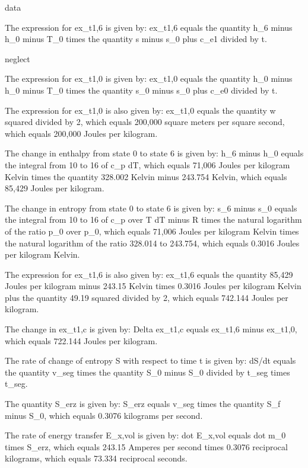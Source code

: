 data

The expression for ex_t1,6 is given by:
ex_t1,6 equals the quantity h_6 minus h_0 minus T_0 times the quantity s minus s_0 plus c_e1 divided by t.

neglect

The expression for ex_t1,0 is given by:
ex_t1,0 equals the quantity h_0 minus h_0 minus T_0 times the quantity s_0 minus s_0 plus c_e0 divided by t.

The expression for ex_t1,0 is also given by:
ex_t1,0 equals the quantity w squared divided by 2, which equals 200,000 square meters per square second, which equals 200,000 Joules per kilogram.

The change in enthalpy from state 0 to state 6 is given by:
h_6 minus h_0 equals the integral from 10 to 16 of c_p dT, which equals 71,006 Joules per kilogram Kelvin times the quantity 328.002 Kelvin minus 243.754 Kelvin, which equals 85,429 Joules per kilogram.

The change in entropy from state 0 to state 6 is given by:
s_6 minus s_0 equals the integral from 10 to 16 of c_p over T dT minus R times the natural logarithm of the ratio p_0 over p_0, which equals 71,006 Joules per kilogram Kelvin times the natural logarithm of the ratio 328.014 to 243.754, which equals 0.3016 Joules per kilogram Kelvin.

The expression for ex_t1,6 is also given by:
ex_t1,6 equals the quantity 85,429 Joules per kilogram minus 243.15 Kelvin times 0.3016 Joules per kilogram Kelvin plus the quantity 49.19 squared divided by 2, which equals 742.144 Joules per kilogram.

The change in ex_t1,c is given by:
Delta ex_t1,c equals ex_t1,6 minus ex_t1,0, which equals 722.144 Joules per kilogram.

The rate of change of entropy S with respect to time t is given by:
dS/dt equals the quantity v_seg times the quantity S_0 minus S_0 divided by t_seg times t_seg.

The quantity S_erz is given by:
S_erz equals v_seg times the quantity S_f minus S_0, which equals 0.3076 kilograms per second.

The rate of energy transfer E_x,vol is given by:
dot E_x,vol equals dot m_0 times S_erz, which equals 243.15 Amperes per second times 0.3076 reciprocal kilograms, which equals 73.334 reciprocal seconds.